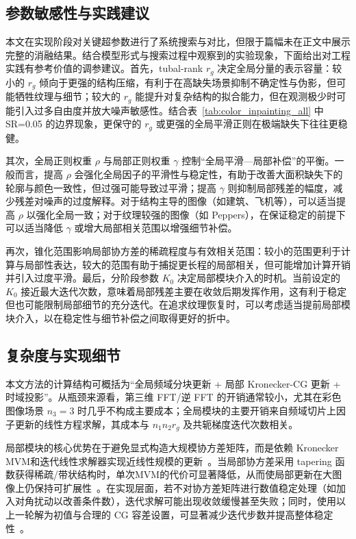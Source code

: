 \documentclass[UTF8]{ctexart}
\begin{document}
\subsection{参数敏感性与实践建议}
本文在实现阶段对关键超参数进行了系统搜索与对比，但限于篇幅未在正文中展示完整的消融结果。结合模型形式与搜索过程中观察到的实验现象，下面给出对工程实践有参考价值的调参建议。首先，tubal-rank $r_g$ 决定全局分量的表示容量：较小的 $r_g$ 倾向于更强的结构压缩，有利于在高缺失场景抑制不确定性与伪影，但可能牺牲纹理与细节；较大的 $r_g$ 能提升对复杂结构的拟合能力，但在观测极少时可能引入过多自由度并放大噪声敏感性。结合表~\ref{tab:color_inpainting_all} 中 SR=0.05 的边界现象，更保守的 $r_g$ 或更强的全局平滑正则在极端缺失下往往更稳健。

其次，全局正则权重 $\rho$ 与局部正则权重 $\gamma$ 控制“全局平滑—局部补偿”的平衡。一般而言，提高 $\rho$ 会强化全局因子的平滑性与稳定性，有助于改善大面积缺失下的轮廓与颜色一致性，但过强可能导致过平滑；提高 $\gamma$ 则抑制局部残差的幅度，减少残差对噪声的过度解释。对于结构主导的图像（如建筑、飞机等），可以适当提高 $\rho$ 以强化全局一致；对于纹理较强的图像（如 Peppers），在保证稳定的前提下可以适当降低 $\gamma$ 或增大局部相关范围以增强细节补偿。

再次，锥化范围影响局部协方差的稀疏程度与有效相关范围：较小的范围更利于计算与局部性表达，较大的范围有助于捕捉更长程的局部相关，但可能增加计算开销并引入过度平滑。最后，分阶段参数 $K_0$ 决定局部模块介入的时机。当前设定的 $K_0$ 接近最大迭代次数，意味着局部残差主要在收敛后期发挥作用，这有利于稳定但也可能限制局部细节的充分迭代。在追求纹理恢复时，可以考虑适当提前局部模块介入，以在稳定性与细节补偿之间取得更好的折中。

\subsection{复杂度与实现细节}
本文方法的计算结构可概括为“全局频域分块更新 + 局部 Kronecker-CG 更新 + 时域投影”。从瓶颈来源看，第三维 FFT/逆 FFT 的开销通常较小，尤其在彩色图像场景 $n_3=3$ 时几乎不构成主要成本；全局模块的主要开销来自频域切片上因子更新的线性方程求解，其成本与 $n_1n_2r_g$ 及共轭梯度迭代次数相关。

局部模块的核心优势在于避免显式构造大规模协方差矩阵，而是依赖 Kronecker MVM和迭代线性求解器实现近线性规模的更新~\cite{lei2024glskf}。当局部协方差采用 tapering 函数获得稀疏/带状结构时，单次MVM的代价可显著降低，从而使局部更新在大图像上仍保持可扩展性~\cite{furrer2006tapering}。在实现层面，若不对协方差矩阵进行数值稳定处理（如加入对角扰动以改善条件数），迭代求解可能出现收敛缓慢甚至失败；同时，使用以上一轮解为初值与合理的 CG 容差设置，可显著减少迭代步数并提高整体稳定性~\cite{hestenes1952cg}。
\end{document}
